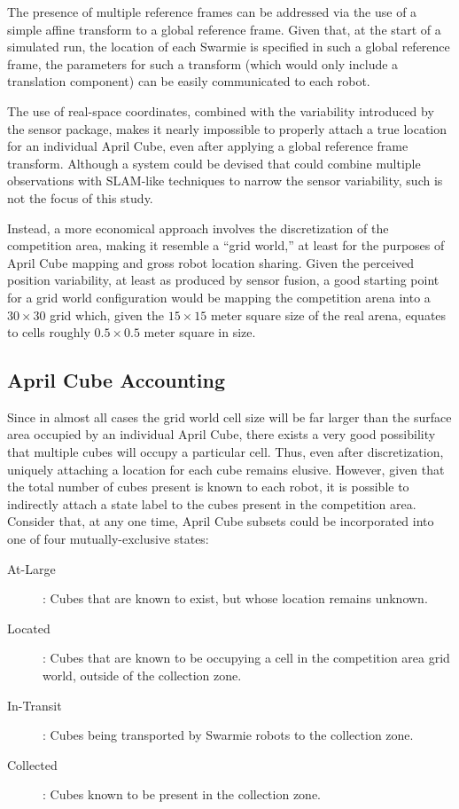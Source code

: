 \documentclass[sigconf,authordraft]{acmart}
\begin{document}
The presence of multiple reference frames can be addressed via the use of a simple affine transform to a global reference frame. Given that, at the start of a simulated run, the location of each Swarmie is specified in such a global reference frame, the parameters for such a transform (which would only include a translation component) can be easily communicated to each robot.

The use of real-space coordinates, combined with the variability introduced by the sensor package, makes it nearly impossible to properly attach a true location for an individual April Cube, even after applying a global reference frame transform. Although a system could be devised that could combine multiple observations with SLAM-like techniques to narrow the sensor variability, such is not the focus of this study.

Instead, a more economical approach involves the discretization of the competition area, making it resemble a ``grid world,'' at least for the purposes of April Cube mapping and gross robot location sharing. Given the perceived position variability, at least as produced by sensor fusion, a good starting point for a grid world configuration would be mapping the competition arena into a $30 \times 30$ grid which, given the $15 \times 15$ meter square size of the real arena, equates to cells roughly $0.5 \times 0.5$ meter square in size.

\subsection{April Cube Accounting}\label{subsec:cube_accounting}
Since in almost all cases the grid world cell size will be far larger than the surface area occupied by an individual April Cube, there exists a very good possibility that multiple cubes will occupy a particular cell. Thus, even after discretization, uniquely attaching a location for each cube remains elusive. However, given that the total number of cubes present is known to each robot, it is possible to indirectly attach a state label to the cubes present in the competition area. Consider that, at any one time, April Cube subsets could be incorporated into one of four mutually-exclusive states:

\begin{description}
  \item[At-Large]: Cubes that are known to exist, but whose location remains unknown.
  \item[Located]: Cubes that are known to be occupying a cell in the competition area grid world, outside of the collection zone.
  \item[In-Transit]: Cubes being transported by Swarmie robots to the collection zone.
  \item[Collected]: Cubes known to be present in the collection zone.
\end{description}
\end{document}
